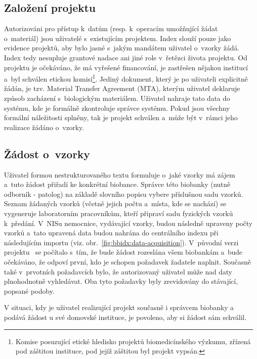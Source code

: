 \subsection{Založení projektu}
Autorizováni pro přístup k~datům (resp. k~operacím umožňující žádat o~materiál) jsou uživatelé s~existujícím projektem. Index slouží pouze jako evidence projektů, aby bylo jasné s~jakým mandátem uživatel o~vzorky žádá. Index tedy nesupluje grantové nadace ani jiné role v~řetězci života projektu. Od projektu je očekáváno, že má vyřešené financování, je zastřešen nějakou institucí a~byl schválen etickou komisí\footnote{Komise posuzující etické hledisko projektů biomedicínského výzkumu, zřízená pod záštitou instituce, pod jejíž záštitou byl projekt vypsán.}. Jediný dokument, který je po uživateli explicitně žádán, je tzv. Material Transfer Agreement (MTA), kterým uživatel deklaruje způsob zacházení s~biologickým materiálem. Uživatel nahraje tato data do systému, kde je formálně zkontroluje správce systému. Pokud jsou všechny formální náležitosti splněny, tak je projekt schválen a~může být v~rámci jeho realizace žádáno o~vzorky.

\subsection{Žádost o~vzorky}
Uživatel formou nestrukturovaného textu formuluje o~jaké vzorky má zájem a~tuto žádost přiřadí ke konkrétní biobance. Správce této biobanky (nutně odborník - patolog) na základě slovního popisu vybere příslušnou sadu vzorků. Seznam žádaných vzorků (včetně jejich počtu a~místa, kde se nachází) se vygeneruje laboratorním pracovníkům, kteří připraví sadu fyzických vzorků k~předání. V~NISu nemocnice, vydávající vzorky, budou následně upraveny počty vzorků a~tato upravená data budou nahrána do centrálního indexu při následujícím importu (viz. obr.~\ref{fig:bbidx:data-acquisition}). 
V~původní verzi projektu~\cite{ARCH_2011_12_29} se počítalo s~tím, že bude žádost rozeslána všem biobankám a~bude očekáváno, že odpoví první, kdo je schopen požadavek žadatele naplnit. Současně také v~prvotních požadavcích bylo, že autorizovaný uživatel může nad daty plnohodnotně vyhledávat. Oba tyto požadavky byly zrevidovány do stávající, popsané podoby.

V situaci, kdy je uživatel realizující projekt současně i správcem biobanky a podává žádost u své domovské instituce, je povoleno, aby si žádost sám schválil.


